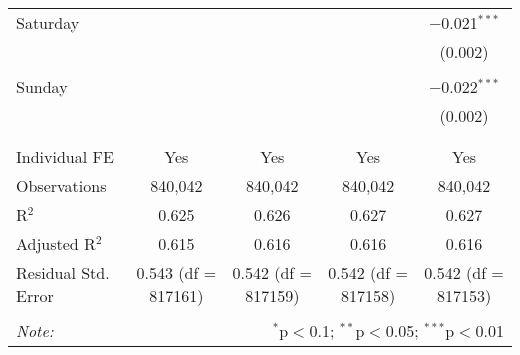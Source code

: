 \documentclass[
]{article}
\begin{document}
\begin{table}[!htbp]
{\begin{tabular}{@{\extracolsep{5pt}}lcccc}
 Saturday &  &  &  & $-$0.021$^{***}$ \\ 
  &  &  &  & (0.002) \\ 
  & & & & \\ 
 Sunday &  &  &  & $-$0.022$^{***}$ \\ 
  &  &  &  & (0.002) \\ 
  & & & & \\ 
\hline \\[-1.8ex] 
Individual FE & Yes & Yes & Yes & Yes \\ 
Observations & 840,042 & 840,042 & 840,042 & 840,042 \\ 
R$^{2}$ & 0.625 & 0.626 & 0.627 & 0.627 \\ 
Adjusted R$^{2}$ & 0.615 & 0.616 & 0.616 & 0.616 \\ 
Residual Std. Error & 0.543 (df = 817161) & 0.542 (df = 817159) & 0.542 (df = 817158) & 0.542 (df = 817153) \\ 
\hline 
\hline \\[-1.8ex] 
\textit{Note:}  & \multicolumn{4}{r}{$^{*}$p$<$0.1; $^{**}$p$<$0.05; $^{***}$p$<$0.01} \\ 
\end{tabular}
} 
\end{table} 
\newpage
\end{document}

